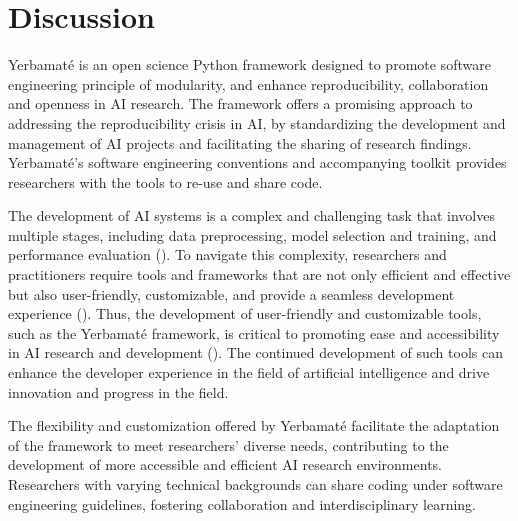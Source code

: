 \section{Discussion}

Yerbamaté is an open science Python framework designed to promote software engineering principle of modularity, and enhance reproducibility, collaboration and openness in AI research. The framework offers a promising approach to addressing the reproducibility crisis in AI, by standardizing the development and management of AI projects and facilitating the sharing of research findings. Yerbamaté's software engineering conventions and accompanying toolkit provides researchers with the tools to re-use and share code. 

The development of AI systems is a complex and challenging task that involves multiple stages, including data preprocessing, model selection and training, and performance evaluation (\cite{lecun2015deep}). To navigate this complexity, researchers and practitioners require tools and frameworks that are not only efficient and effective but also user-friendly, customizable, and provide a seamless development experience (\cite{cardoso2022monai,pathml,thingsvision, olson2018system}). Thus, the development of user-friendly and customizable tools, such as the Yerbamaté framework, is critical to promoting ease and accessibility in AI research and development (\cite{olson2018system}). The continued development of such tools can enhance the developer experience in the field of artificial intelligence and drive innovation and progress in the field.


The flexibility and customization offered by Yerbamaté facilitate the adaptation of the framework to meet researchers' diverse needs, contributing to the development of more accessible and efficient AI research environments. Researchers with varying technical backgrounds can share coding under software engineering guidelines, fostering collaboration and interdisciplinary learning.


